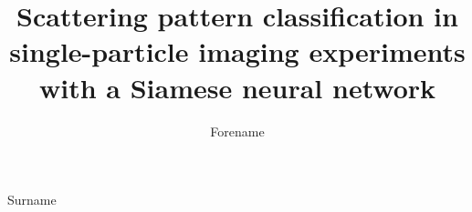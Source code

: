 \documentclass[preprint]{iucr}
\begin{document}
    \title{Scattering pattern classification in single-particle imaging experiments with a Siamese neural network}
    \author[a]{Forename}{Surname}

    \maketitle

    
    
    
    
    
    
    

    
    
\end{document}

